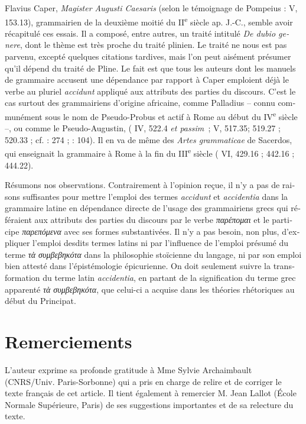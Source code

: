 \documentclass[output=paper]{langsci/langscibook}
\begin{document}
\begin{otherlanguage}{french}
Flavius Caper, \textit{Magister Augusti Caesaris} (selon le témoignage de Pompeius :  V, 153.13), grammairien de la deuxième moitié du II\textsuperscript{e} siècle ap. J.-C., semble avoir récapitulé ces essais. Il a composé, entre autres, un traité intitulé \textit{De dubio genere}, dont le thème est très proche du traité plinien. Le traité ne nous est pas parvenu, excepté quelques citations tardives, mais l’on peut aisément présumer qu’il dépend du traité de Pline. Le fait est que tous les auteurs dont les manuels de grammaire accusent une dépendance par rapport à Caper emploient déjà le verbe au pluriel \textit{accidunt} appliqué aux attributs des parties du discours. C’est le cas surtout des grammairiens d’origine africaine, comme Palladius – connu communément sous le nom de Pseudo-Probus et actif à Rome au début du IV\textsuperscript{e} siècle –, ou comme le Pseudo-Augustin, ( IV, 522.4 \textit{et passim~}; V, 517.35; 519.27 ; 520.33 ; cf. \citealt{basset_ptota_2007}: 274 ; \citeyear{mazhuga_uber_2011}: 104). Il en va de même des \textit{Artes grammaticae} de Sacerdos, qui enseignait la grammaire à Rome à la fin du III\textsuperscript{e} siècle ( VI, 429.16 ; 442.16 ; 444.22).

Résumons nos observations. Contrairement à l’opinion reçue, il n’y a pas de raisons suffisantes pour mettre l’emploi des termes \textit{accidunt} et \textit{accidentia} dans la grammaire latine en dépendance directe de l’usage des grammairiens grecs qui référaient aux attributs des parties du discours par le verbe \textit{παρέπομαι} et le participe \textit{παρεπόμενα} avec ses formes substantivées. Il n’y a pas besoin, non plus, d’expliquer l’emploi desdits termes latins ni par l’influence de l’emploi présumé du terme \textit{τὰ συμβεβηκότα} dans la philosophie stoïcienne du langage, ni par son emploi bien attesté dans l’épistémologie épicurienne. On doit seulement suivre la transformation du terme latin \textit{accidentia}, en partant de la signification du terme grec apparenté \textit{τὰ συμβεβηκότα}, que celui-ci a acquise dans les théories rhétoriques au début du Principat.

\section*{Remerciements}
L'auteur exprime sa profonde gratitude à Mme Sylvie Archaimbault (CNRS/Univ. Paris-Sorbonne) qui a pris en charge de relire et de corriger le texte français de cet article. Il tient également à remercier M. Jean Lallot (École Normale Supérieure, Paris) de ses suggestions importantes et de sa relecture du texte.

\printbibliography[keyword=primary,heading=FRprimary]

{\sloppy\printbibliography[heading=FRsecondary,notkeyword=primary]}
\end{otherlanguage}
\end{document}
